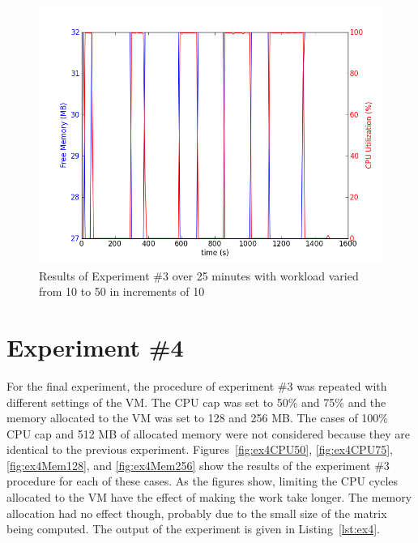 \documentclass{article}
\begin{document}
  \begin{figure}
    \begin{center}
      \includegraphics[scale=0.50]{ex3.png} 
      \caption{Results of Experiment \#3 over 25 minutes with workload
      varied from 10 to 50 in increments of 10}
      \label{fig:ex3}
    \end{center}
  \end{figure}

  

\section{Experiment \#4}
  For the final experiment, the procedure of experiment \#3 was repeated
  with different settings of the VM. The CPU cap was set to 50\% and
  75\% and the memory allocated to the VM was set to 128 and 256 MB. The
  cases of 100\% CPU cap and 512 MB of allocated memory were not
  considered because they are identical to the previous experiment.
  Figures~\ref{fig:ex4CPU50}, \ref{fig:ex4CPU75}, \ref{fig:ex4Mem128}, and
  \ref{fig:ex4Mem256}
  show the results of the experiment \#3 procedure for each of these
  cases. As the figures show, limiting the CPU cycles allocated to the
  VM have the effect of making the work take longer. The memory
  allocation had no effect though, probably due to the small size of the
  matrix being computed. The output of the experiment is given in
  Listing~\ref{lst:ex4}.
\end{document}
